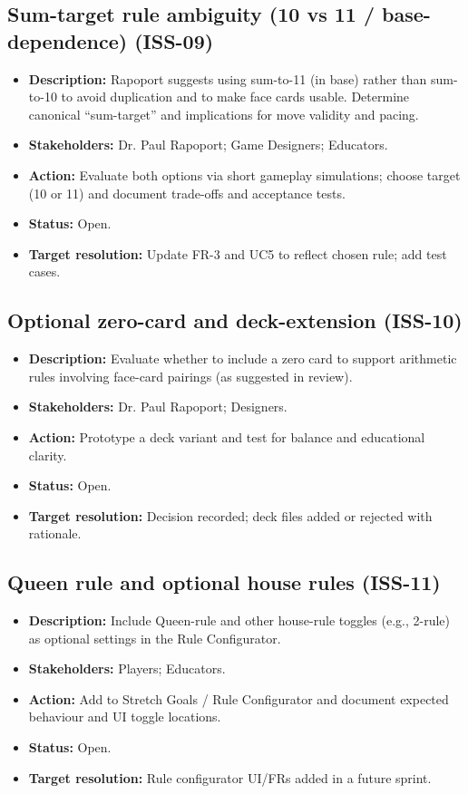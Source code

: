 \documentclass[12pt]{article}
\begin{document}
\subsection{Sum-target rule ambiguity (10 vs 11 / base-dependence) (ISS-09)}
\begin{itemize}
  \item \textbf{Description:} Rapoport suggests using sum-to-11 (in base) rather than sum-to-10 to avoid duplication and to make face cards usable. Determine canonical “sum-target” and implications for move validity and pacing.
  \item \textbf{Stakeholders:} Dr. Paul Rapoport; Game Designers; Educators.
  \item \textbf{Action:} Evaluate both options via short gameplay simulations; choose target (10 or 11) and document trade-offs and acceptance tests.
  \item \textbf{Status:} Open.
  \item \textbf{Target resolution:} Update FR-3 and UC5 to reflect chosen rule; add test cases.
\end{itemize}

\subsection{Optional zero-card and deck-extension (ISS-10)}
\begin{itemize}
  \item \textbf{Description:} Evaluate whether to include a zero card to support arithmetic rules involving face-card pairings (as suggested in review).
  \item \textbf{Stakeholders:} Dr. Paul Rapoport; Designers.
  \item \textbf{Action:} Prototype a deck variant and test for balance and educational clarity.
  \item \textbf{Status:} Open.
  \item \textbf{Target resolution:} Decision recorded; deck files added or rejected with rationale.
\end{itemize}

\subsection{Queen rule and optional house rules (ISS-11)}
\begin{itemize}
  \item \textbf{Description:} Include Queen-rule and other house-rule toggles (e.g., 2-rule) as optional settings in the Rule Configurator.
  \item \textbf{Stakeholders:} Players; Educators.
  \item \textbf{Action:} Add to Stretch Goals / Rule Configurator and document expected behaviour and UI toggle locations.
  \item \textbf{Status:} Open.
  \item \textbf{Target resolution:} Rule configurator UI/FRs added in a future sprint.
\end{itemize}
\end{document}
